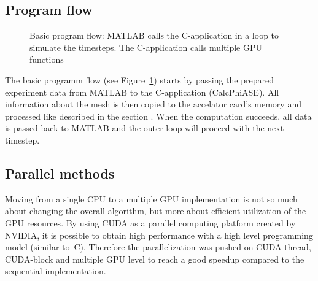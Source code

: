 \subsection{Program flow}
\label{subsec:program_flow}
\begin{figure}[H]
  \centerline
  {}
  \caption{Basic program flow: MATLAB calls the C-application in a loop to
  simulate the timesteps. The C-application calls multiple GPU functions}
  \label{graphic:pap1}
\end{figure}
The basic programm flow (see Figure~\ref{graphic:pap1}) starts
by passing the prepared experiment data from MATLAB \cite{matlab}
to the C-application (CalcPhiASE). All information about the mesh is then copied
to the accelator card's memory and processed like described in 
the section . When the computation succeeds, 
all data is passed back to MATLAB and the outer loop will proceed 
with the next timestep. 

\subsection{Parallel methods}
\label{subsec:parallel_methods}
Moving from a single CPU to a multiple
GPU implementation is not so much about changing the overall algorithm,
but more about efficient utilization of the GPU resources. 
By using CUDA\cite{cuda} as a parallel computing platform created by NVIDIA\cite{nvidia},
it is possible to obtain high performance with a high level 
programming model (similar to~C). Therefore the parallelization was pushed on CUDA-thread, 
CUDA-block and multiple GPU level to reach a good speedup compared to 
the sequential implementation. 

